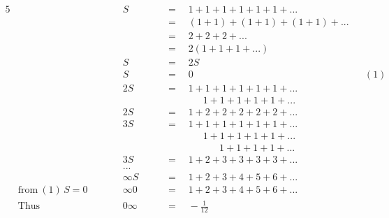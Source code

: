 \begin{alignat*}{5}
&\,&&S\quad&&\,=\quad1+1+1+1+1+1+...\\
&\,&&\,&&\,=\quad(1+1)+(1+1)+(1+1)+...\\
&\,&&\,&&\,=\quad2+2+2+...\\
&\,&&\,&&\,=\quad2(1+1+1+...)\\
&\,&&S\quad&&\,=\quad2S\\
&\,&&S\quad&&\,=\quad0&&(1)\\
&\,&&2S\quad&&\,=\quad1+1+1+1+1+1+...\\
&\,&&\,&&\qquad\qquad1+1+1+1+1+...\\
&\,&&2S&&\,=\quad1+2+2+2+2+2+...\\
&\,&&3S\quad&&\,=\quad1+1+1+1+1+1+...\\
&\,&&\,&&\qquad\quad\quad1+1+1+1+1+...\\
&\,&&\,&&\qquad\qquad\quad~~~1+1+1+1+...\\
&\,&&3S\quad&&\,=\quad1+2+3+3+3+3+...\\
&\,&&...\\
&\,&&\infty S\quad&&\,=\quad1+2+3+4+5+6+...\\
&\mathrm{from~(1)}\,S=0\qquad&&\infty0\quad&&\,=\quad1+2+3+4+5+6+...\\
&\mathrm{Thus}\qquad&&0\infty\quad&&\,=\quad-\frac{1}{12}
\end{alignat*}
